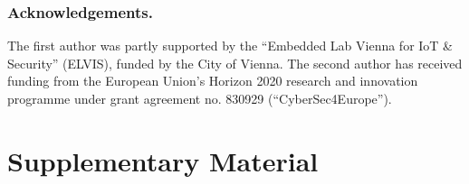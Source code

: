 \documentclass[runningheads]{llncs}
\begin{document}

%
%
%

\subsubsection{Acknowledgements.}

The first author was partly supported by the ``Embedded Lab Vienna for  IoT \& Security'' (ELVIS), funded by the City of Vienna.
The second author has received funding from the European Union's Horizon 2020 research and innovation programme under grant agreement no. 830929 (``CyberSec4Europe'').

 





%
%
%
%

\ifCANS
\else
\newpage
\appendix

\section{Supplementary Material}
\label{s:appendix}
\end{document}

